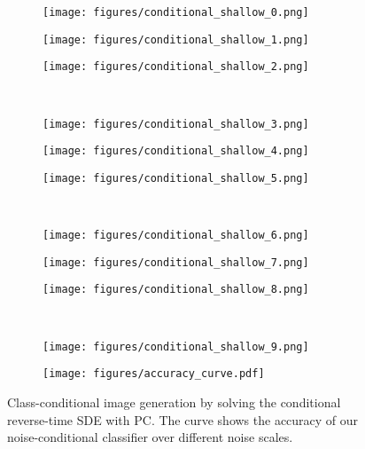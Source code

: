 \documentclass{article} \usepackage{iclr2021_conference,times}
\begin{document}
\begin{figure}
    \centering
    \begin{subfigure}{0.32\textwidth}
        \texttt{[image: figures/conditional\_shallow\_0.png]}
    \end{subfigure}
    \begin{subfigure}{0.32\textwidth}
        \texttt{[image: figures/conditional\_shallow\_1.png]}
    \end{subfigure}
    \begin{subfigure}{0.32\textwidth}
        \texttt{[image: figures/conditional\_shallow\_2.png]}
    \end{subfigure}\\
    \begin{subfigure}{0.32\textwidth}
        \texttt{[image: figures/conditional\_shallow\_3.png]}
    \end{subfigure}
    \begin{subfigure}{0.32\textwidth}
        \texttt{[image: figures/conditional\_shallow\_4.png]}
    \end{subfigure}
    \begin{subfigure}{0.32\textwidth}
        \texttt{[image: figures/conditional\_shallow\_5.png]}
    \end{subfigure}\\
    \begin{subfigure}{0.32\textwidth}
        \texttt{[image: figures/conditional\_shallow\_6.png]}
    \end{subfigure}
    \begin{subfigure}{0.32\textwidth}
        \texttt{[image: figures/conditional\_shallow\_7.png]}
    \end{subfigure}
    \begin{subfigure}{0.32\textwidth}
        \texttt{[image: figures/conditional\_shallow\_8.png]}
    \end{subfigure}\\
    \begin{subfigure}{0.32\textwidth}
        \texttt{[image: figures/conditional\_shallow\_9.png]}
    \end{subfigure}
    \begin{subfigure}{0.4\textwidth}
        \texttt{[image: figures/accuracy\_curve.pdf]}
    \end{subfigure}
    \caption{Class-conditional image generation by solving the conditional reverse-time SDE with PC. The curve shows the accuracy of our noise-conditional classifier over different noise scales.}
    \label{fig:cond_sample_extend}
\end{figure}
\end{document}
